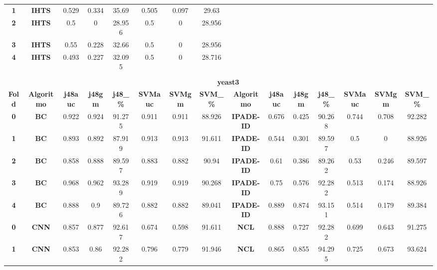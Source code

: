 {{\begin{tabular}{c|c|cccccc|ccccccc}
\textbf{1} & \textbf{IHTS} & 0.529 & 0.334 & 35.69 & 0.505 & 0.097 & 29.63 &       &       &       &       &       &       &  \\
\textbf{2} & \textbf{IHTS} & 0.5   & 0     & 28.956 & 0.5   & 0     & 28.956 &       &       &       &       &       &       &  \\
\textbf{3} & \textbf{IHTS} & 0.55  & 0.228 & 32.66 & 0.5   & 0     & 28.956 &       &       &       &       &       &       &  \\
\textbf{4} & \textbf{IHTS} & 0.493 & 0.227 & 32.095 & 0.5   & 0     & 28.716 &       &       &       &       &       &       &  \\
\multicolumn{1}{c}{} & \multicolumn{1}{c}{} &       &       &       &       &       & \multicolumn{1}{c}{} &       &       &       &       &       &       &  \\
\multicolumn{1}{c}{} & \multicolumn{14}{c}{\textbf{yeast3}} \\
\midrule
\textbf{Fold} & \textbf{Algoritmo} & \textbf{j48auc} & \textbf{j48gm} & \textbf{j48\_\%} & \textbf{SVMauc} & \textbf{SVMgm} & \textbf{SVM\_\%} & \multicolumn{1}{c|}{\textbf{Algoritmo}} & \textbf{j48auc} & \textbf{j48gm} & \textbf{j48\_\%} & \textbf{SVMauc} & \textbf{SVMgm} & \textbf{SVM\_\%} \\
\midrule
\textbf{0} & \textbf{BC} & 0.922 & 0.924 & 91.275 & 0.911 & 0.911 & 88.926 & \multicolumn{1}{c|}{\textbf{IPADE-ID}} & 0.676 & 0.425 & 90.268 & 0.744 & 0.708 & 92.282 \\
\textbf{1} & \textbf{BC} & 0.893 & 0.892 & 87.919 & 0.913 & 0.913 & 91.611 & \multicolumn{1}{c|}{\textbf{IPADE-ID}} & 0.544 & 0.301 & 89.597 & 0.5   & 0     & 88.926 \\
\textbf{2} & \textbf{BC} & 0.858 & 0.888 & 89.597 & 0.883 & 0.882 & 90.94 & \multicolumn{1}{c|}{\textbf{IPADE-ID}} & 0.61  & 0.386 & 89.262 & 0.53  & 0.246 & 89.597 \\
\textbf{3} & \textbf{BC} & 0.968 & 0.962 & 93.289 & 0.919 & 0.919 & 90.268 & \multicolumn{1}{c|}{\textbf{IPADE-ID}} & 0.75  & 0.576 & 92.282 & 0.513 & 0.174 & 88.926 \\
\textbf{4} & \textbf{BC} & 0.888 & 0.9   & 89.726 & 0.882 & 0.882 & 89.041 & \multicolumn{1}{c|}{\textbf{IPADE-ID}} & 0.889 & 0.874 & 93.151 & 0.514 & 0.179 & 89.384 \\
\textbf{0} & \textbf{CNN} & 0.857 & 0.877 & 92.617 & 0.674 & 0.598 & 91.611 & \multicolumn{1}{c|}{\textbf{NCL}} & 0.888 & 0.727 & 92.282 & 0.699 & 0.643 & 91.275 \\
\textbf{1} & \textbf{CNN} & 0.853 & 0.86  & 92.282 & 0.796 & 0.779 & 91.946 & \multicolumn{1}{c|}{\textbf{NCL}} & 0.865 & 0.855 & 94.295 & 0.725 & 0.673 & 93.624 \\

\end{tabular}}}
